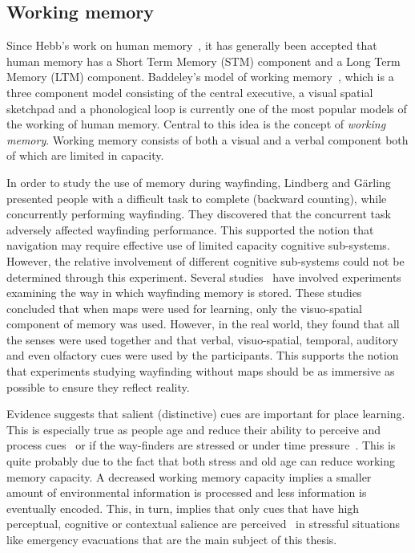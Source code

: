 \subsection{Working memory} %
\label{sec:spatial_information_in_human_working_memory}


Since Hebb's work on human memory~\cite{DOH1949}, it has generally been accepted that human memory has a Short Term Memory (STM) component and a Long Term Memory (LTM) component. Baddeley's model of working memory~\cite{BaddeleyHitch74}, which is a three component model consisting of the central executive, a visual spatial sketchpad and a phonological loop is currently one of the most popular models of the working of human memory. Central to this idea is the concept of \emph{working memory}. Working memory consists of both a visual and a verbal component both of which are limited in capacity.


In order to study the use of memory during wayfinding, Lindberg and G{\"a}rling~\cite{lindberg1981acquisition} presented people with a difficult task to complete (backward counting), while concurrently performing wayfinding. They discovered that the concurrent task adversely affected wayfinding performance. This supported the notion that navigation may require effective use of limited capacity cognitive sub-systems. However, the relative involvement of different cognitive sub-systems could not be determined through this experiment. Several studies~\cite{Garden1992, meilinger2008working} have involved experiments examining the way in which wayfinding memory is stored. These studies concluded that when maps were used for learning, only the visuo-spatial component of memory was used. However, in the real world, they found that all the senses were used together and that verbal, visuo-spatial, temporal, auditory and even olfactory cues were used by the participants. This supports the notion that experiments studying wayfinding without maps should be as immersive as possible to ensure they reflect reality.

Evidence suggests that salient (distinctive) cues are important for place learning. This is especially true as people age and reduce their ability to perceive and process cues~\cite{Davis01122009} or if the way-finders are stressed or under time pressure~\cite{Ozel:2001tn}. This is quite probably due to the fact that both stress and old age can reduce working memory capacity. A decreased working memory capacity implies a smaller amount of environmental information is processed and less information is eventually encoded. This, in turn, implies that only cues that have high perceptual, cognitive or contextual salience are perceived~\cite{Davis01122009} in stressful situations like emergency evacuations that are the main subject of this thesis.

